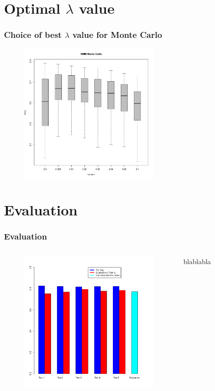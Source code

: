 \documentclass[presentation]{beamer}   %
\begin{document}
\section{Optimal $\lambda$ value}
\begin{frame}
  \frametitle{Choice of best $\lambda$ value for Monte Carlo}
	\begin{figure}
		\centering
		\includegraphics[width=70mm,height=70mm]{fig/choice_lambda_mc.pdf}
	\end{figure}
\end{frame}

\section{Evaluation}
\begin{frame}
  \frametitle{Evaluation}
  \begin{columns}[t] %
		\begin{figure}
		\centering
			\includegraphics[width=70mm,height=70mm]{fig/barplot.pdf}
		\end{figure}
		\centering
		\begin{block}\centering
		blablabla
		\end{block}
  \end{columns}
\end{frame}
\end{document}
